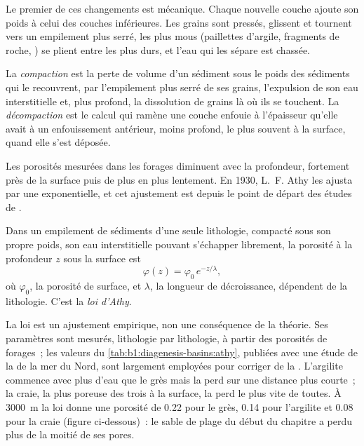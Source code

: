 Le premier de ces changements est mécanique. Chaque nouvelle couche ajoute son poids à
celui des couches inférieures. Les grains sont pressés, glissent et tournent vers un empilement
plus serré, les plus mous (paillettes d'argile, fragments de roche, ) se plient entre les plus
durs, et l'eau qui les sépare est chassée.

\begin{definition}\label{def:b1:diagenesis-basins:compaction}
La \emph{compaction} est la perte de volume d'un sédiment sous
le poids des sédiments qui le recouvrent, par l'empilement plus serré de ses grains,
l'expulsion de son eau interstitielle et, plus profond, la dissolution de grains là où ils
se touchent. La \emph{décompaction} est le calcul qui ramène
une couche enfouie à l'épaisseur qu'elle avait à un enfouissement antérieur, moins profond, le plus
souvent à la surface, quand elle s'est déposée.
\end{definition}

Les porosités mesurées dans les forages diminuent avec la profondeur, fortement près de la surface puis
de plus en plus lentement. En 1930, L.~F. Athy les ajusta par une exponentielle, et
cet ajustement est depuis le point de départ des études de .

\begin{proposition}\label{prop:b1:diagenesis-basins:athy}
Dans un empilement de sédiments d'une seule lithologie, compacté sous son propre poids, son
eau interstitielle pouvant s'échapper librement, la porosité à la profondeur $z$ sous la surface est
\[
  \varphi(z) = \varphi_0\, e^{-z/\lambda},
\]
où $\varphi_0$, la porosité de surface, et $\lambda$, la longueur de décroissance, dépendent
de la lithologie. C'est la \emph{loi d'Athy}.
\end{proposition}
\admitted

La loi est un ajustement empirique, non une conséquence de la théorie. Ses paramètres sont
mesurés, lithologie par lithologie, à partir des porosités de forages~; les valeurs du
\cref{tab:b1:diagenesis-basins:athy}, publiées avec une étude de la 
de la mer du Nord, sont largement employées pour corriger de la . L'argilite commence avec plus d'eau
que le grès mais la perd sur une distance plus courte~; la craie, la plus poreuse des trois à la
surface, la perd le plus vite de toutes. À \qty{3000}{m} la loi donne une porosité de
\num{0.22} pour le grès, \num{0.14} pour l'argilite et \num{0.08} pour la craie (figure
ci-dessous)~: le sable de plage du début du chapitre a perdu plus de la moitié de ses pores.

